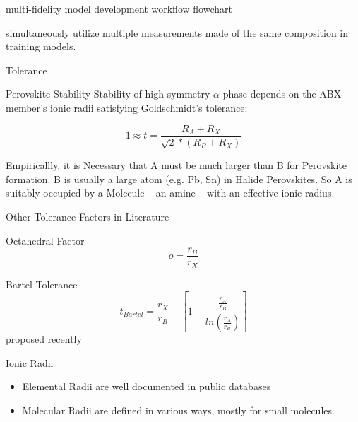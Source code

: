 \documentclass[10pt, aspectratio=169, presentation]{beamer}
\begin{document}
\begin{frame}[label={sec:org7d1a240}]{multi-fidelity model development workflow}
\alert{flowchart}

simultaneously utilize multiple measurements made of the same
composition in training models.\autocite{manganaris-2022-mrs-comput}
\end{frame}

\begin{frame}[label={sec:orga49c0c4}]{Tolerance}
\begin{block}{Perovskite Stability}
Stability of high symmetry \(\alpha\) phase depends on the ABX member's
ionic radii satisfying Goldschmidt's tolerance:
\autocite{yin-2015-halid-perov}

\[
1 \approx t = \frac{R_A+R_X}{\sqrt{2}*(R_B+R_X)}
\]

Empiricallly, it is \alert{Necessary} that A must be much larger than B
for Perovskite formation. B is usually a large atom (e.g. Pb, Sn) in
Halide Perovskites. So A is suitably occupied by a Molecule -- an
amine -- with an effective ionic radius.
\autocite{kieslich-2015-exten-toler}
\end{block}
\end{frame}
\begin{frame}[label={sec:org0613579}]{Other Tolerance Factors in Literature}
\begin{block}{Octahedral Factor}
\[
o=\frac{r_B}{r_X}
\]
\end{block}
\begin{block}{Bartel Tolerance}
\[
t_{Bartel}=\frac{r_X}{r_B}-[1-\frac{\frac{r_A}{r_B}}{ln(\frac{r_A}{r_B})}]
\]
proposed recently
\autocite{bartel-2019-new-toler}
\end{block}
\begin{block}{Ionic Radii}
\begin{itemize}
\item Elemental Radii are well documented in public databases
\item Molecular Radii are defined in various ways, mostly for small
molecules.
\end{itemize}
\end{block}
\end{frame}
\end{document}
